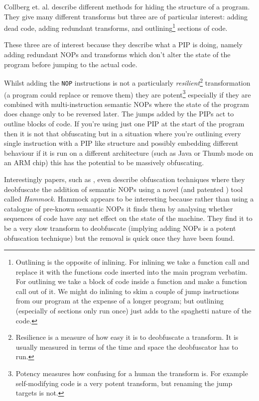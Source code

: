 \documentclass[10pt,]{book}
\begin{document}
Collberg et. al. \autocite{Collberg:1997vt} describe different methods
for hiding the structure of a program. They give many different
transforms but three are of particular interest: adding dead code,
adding redundant transforms, and outlining\footnote{Outlining is the
  opposite of inlining. For inlining we take a function call and replace
  it with the functions code inserted into the main program verbatim.
  For outlining we take a block of code inside a function and make a
  function call out of it. We might do inlining to skim a couple of jump
  instructions from our program at the expense of a longer program; but
  outlining (especially of sections only run once) just adds to the
  spaghetti nature of the code.} sections of code.

These three are of interest because they describe what a PIP is doing,
namely adding redundant NOPs and transforms which don't alter the state
of the program before jumping to the actual code.

Whilst adding the \lstinline!NOP! instructions is not a particularly
\emph{resilient}\footnote{Resilience is a measure of how easy it is to
  deobfuscate a transform. It is usually measured in terms of the time
  and space the deobfuscator has to run.} transformation (a program
could replace or remove them) they are potent\footnote{Potency measures
  how confusing for a human the transform is. For example self-modifying
  code is a very potent transform, but renaming the jump targets is not.}
especially if they are combined with multi-instruction semantic NOPs
where the state of the program does change only to be reversed later.
The jumps added by the PIPs act to outline blocks of code. If you're
using just one PIP at the start of the program then it is not that
obfuscating but in a situation where you're outlining every single
instruction with a PIP like structure and possibly embedding different
behaviour if it is run on a different architecture (such as Java or
Thumb mode on an ARM chip) this has the potential to be massively
obfuscating.

Interestingly papers, such as
\autocite{Christodorescu:2005vh}\autocite{Christodorescu:2005vf}, even
describe obfuscation techniques where they deobfuscate the addition of
semantic NOPs using a novel (and patented
\autocite{Christodorescu:2009wo}) tool called \emph{Hammock}. Hammock
appears to be interesting because rather than using a catalogue of
pre-known semantic NOPs it finds them by analysing whether sequences of
code have any net effect on the state of the machine. They find it to be
a very slow transform to deobfuscate (implying adding NOPs is a potent
obfuscation technique) but the removal is quick once they have been
found.
\end{document}
